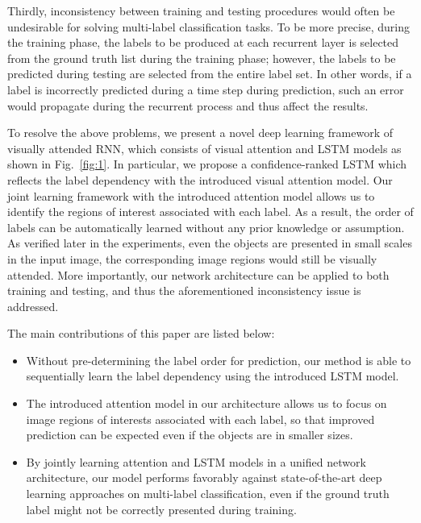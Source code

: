 \documentclass[letterpaper]{article} %
\begin{document}
Thirdly, inconsistency between training and testing procedures would often be undesirable for solving multi-label classification tasks. To be more precise, during the training phase, the labels to be produced at each recurrent layer is selected from the ground truth list during the training phase; however, the labels to be predicted during testing are selected from the entire label set. In other words, if a label is incorrectly predicted during a time step during prediction, such an error would propagate during the recurrent process and thus affect the results.

To resolve the above problems, we present a novel deep learning framework of visually attended RNN, which consists of visual attention and LSTM models as shown in Fig.~\ref{fig:1}. In particular, we propose a confidence-ranked LSTM which reflects the label dependency with the introduced visual attention model. Our joint learning framework with the introduced attention model allows us to identify the regions of interest associated with each label. As a result, the order of labels can be automatically learned without any prior knowledge or assumption. As verified later in the experiments, even the objects are presented in small scales in the input image, the corresponding image regions would still be visually attended. More importantly, our network architecture can be applied to both training and testing, and thus the aforementioned inconsistency issue is addressed.


The main contributions of this paper are listed below: %
\begin{itemize}
	\item Without pre-determining the label order for prediction, our method is able to sequentially learn the label dependency using the introduced LSTM model.
	\item The introduced attention model in our architecture allows us to focus on image regions of interests associated with each label, so that improved prediction can be expected even if the objects are in smaller sizes.
	\item By jointly learning attention and LSTM models in a unified network architecture, our model performs favorably against state-of-the-art deep learning approaches on multi-label classification, even if the ground truth label might not be correctly presented during training.
\end{itemize}
\end{document}

